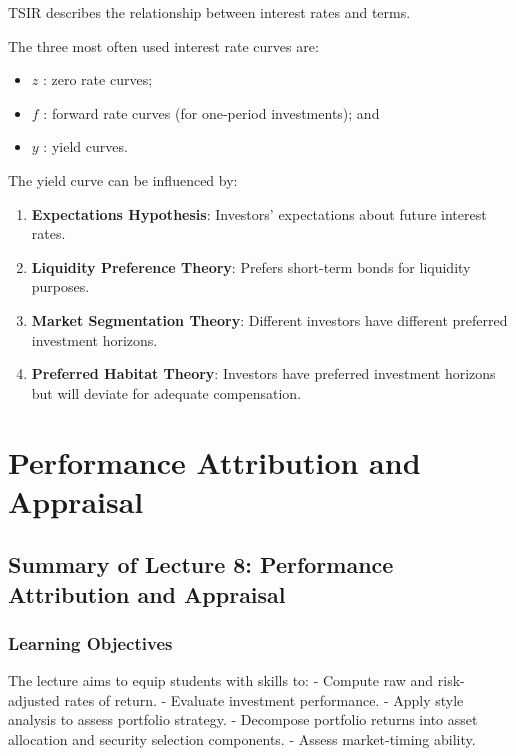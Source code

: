 \documentclass[
]{book}
\providecommand{\tightlist}{%
  \setlength{\itemsep}{0pt}\setlength{\parskip}{0pt}}
\begin{document}
TSIR describes the relationship between interest rates and terms.

The three most often used interest rate curves are:

\begin{itemize}
\tightlist
\item
  \(z\) : zero rate curves;
\item
  \(f\) : forward rate curves (for one-period investments); and
\item
  \(y\) : yield curves.
\end{itemize}

The yield curve can be influenced by:

\begin{enumerate}
\def\labelenumi{\arabic{enumi}.}
\tightlist
\item
  \textbf{Expectations Hypothesis}: Investors' expectations about future
  interest rates.
\item
  \textbf{Liquidity Preference Theory}: Prefers short-term bonds for
  liquidity purposes.
\item
  \textbf{Market Segmentation Theory}: Different investors have
  different preferred investment horizons.
\item
  \textbf{Preferred Habitat Theory}: Investors have preferred investment
  horizons but will deviate for adequate compensation.
\end{enumerate}

\hypertarget{ch8}{%
\chapter{Performance Attribution and Appraisal}\label{ch8}}

\hypertarget{summary-of-lecture-8-performance-attribution-and-appraisal}{%
\section{Summary of Lecture 8: Performance Attribution and
Appraisal}\label{summary-of-lecture-8-performance-attribution-and-appraisal}}

\hypertarget{learning-objectives-2}{%
\subsection{Learning Objectives}\label{learning-objectives-2}}

The lecture aims to equip students with skills to: - Compute raw and
risk-adjusted rates of return. - Evaluate investment performance. -
Apply style analysis to assess portfolio strategy. - Decompose portfolio
returns into asset allocation and security selection components. -
Assess market-timing ability.
\end{document}
